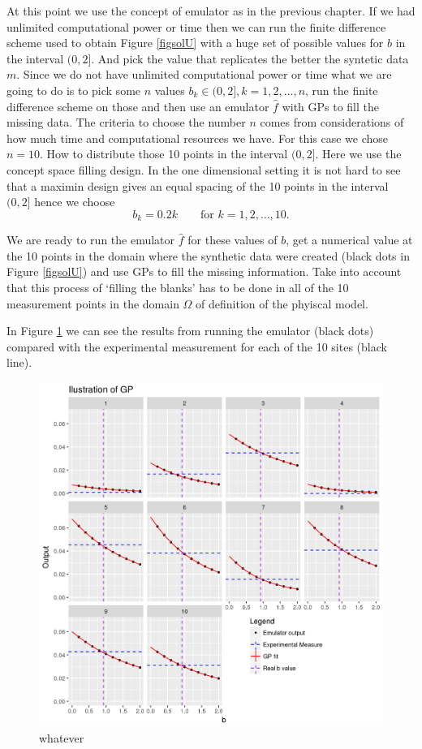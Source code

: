 \documentclass[12pt]{book}
\begin{document}
At this point  we use the concept of emulator as in the previous chapter. If we had unlimited computational
power or time then we can run the finite difference scheme used to obtain Figure \ref{figsolU} with
a huge set of possible values for $b$ in the interval $(0,2]$. And pick the value that replicates the
better the syntetic data $m$. Since we do not have unlimited computational power or time what we
are going to do is to pick some $n$  values $b_{k}\in (0,2], k=1,2,\ldots,n$, run the finite difference
scheme on those and then use an emulator $\hat{f}$ with GPs to fill the missing data. The criteria to 
choose the number $n$ comes from considerations of how much time and computational resources we have.
For this case we chose $n=10$. How to distribute those 10 points in the interval $(0,2]$. Here we
use the concept space filling design. In the one dimensional setting it is not hard to see that
a maximin design gives an equal spacing of the 10 points in the interval $(0,2]$ hence we choose
\begin{equation*}
b_{k}=0.2k \qquad\text{for }k=1,2,\ldots,10.
\end{equation*}

We are ready to run the emulator $\hat{f}$ for these values of $b$, get a numerical value at
the 10 points in the domain where the synthetic data were created (black dots in Figure \ref{figsolU})
and use GPs to fill the missing information. Take into account that this process of `filling the blanks'
has to be done in all of the 10 measurement points in the domain $\Omega$ of definition of the phyiscal model.

In Figure \ref{fignofitted} we can see the results from running the emulator (black dots) compared
with the experimental measurement for each of the 10 sites (black line).

\begin{figure}[H]
\centering
\includegraphics[scale=0.7]{./FigChap3/fitted}
\caption{whatever}
\label{fignofitted}
\end{figure}
\end{document}
